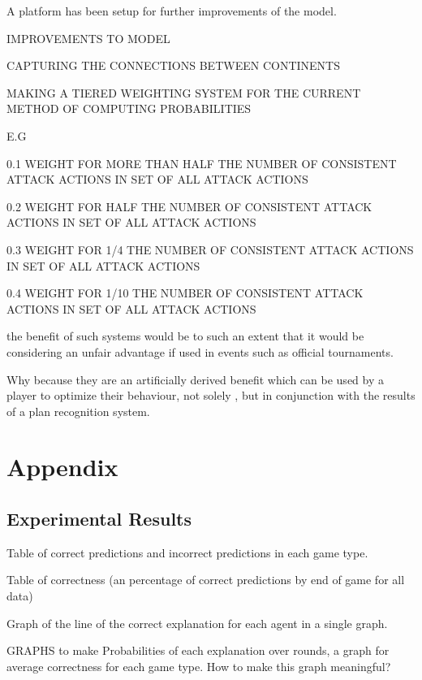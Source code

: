 \documentclass[parskip]{cs4rep}
\begin{document}
A platform has been setup for further improvements of the model.

IMPROVEMENTS TO MODEL

CAPTURING THE CONNECTIONS BETWEEN CONTINENTS

MAKING A TIERED WEIGHTING SYSTEM FOR THE CURRENT METHOD OF COMPUTING PROBABILITIES

E.G 

0.1 WEIGHT FOR MORE THAN HALF THE NUMBER OF CONSISTENT ATTACK ACTIONS IN SET OF ALL ATTACK ACTIONS

0.2 WEIGHT FOR HALF THE NUMBER OF CONSISTENT ATTACK ACTIONS IN SET OF ALL ATTACK ACTIONS

0.3 WEIGHT FOR 1/4 THE NUMBER OF CONSISTENT ATTACK ACTIONS IN SET OF ALL ATTACK ACTIONS

0.4 WEIGHT FOR 1/10 THE NUMBER OF CONSISTENT ATTACK ACTIONS IN SET OF ALL ATTACK ACTIONS

the benefit of such systems would be to such an extent that it would be considering an unfair advantage if used in events such as official tournaments.

Why because they are an artificially derived benefit which can be used by a player to optimize their behaviour, not solely , but in conjunction with the results of a plan recognition system.

\chapter{Appendix}

\section{Experimental Results}

Table of correct predictions and incorrect predictions in each game type.

Table of correctness (an percentage of correct predictions by end of game for all data)

Graph of the line of the correct explanation for each agent in a single graph.

GRAPHS to make
Probabilities of each explanation over rounds, a graph for average correctness for each game type.
How to make this graph meaningful?



\end{document}
